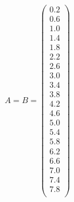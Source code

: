 \documentclass[12pt]{article}
\begin{document}
\begin{equation*}
    A=B=\left(
    \begin{array}{cccccccccccccccccccc}
0.2 \\ 0.6 \\ 1.0 \\ 1.4 \\ 1.8 \\ 2.2 \\ 2.6 \\ 3.0 \\ 3.4 \\ 3.8 \\ 4.2 \\ 4.6 \\ 5.0 \\ 5.4 \\ 5.8 \\ 6.2 \\ 6.6 \\ 7.0 \\ 7.4 \\ 7.8 \\

    \end{array}
    \right)
\end{equation*}
\end{document}
